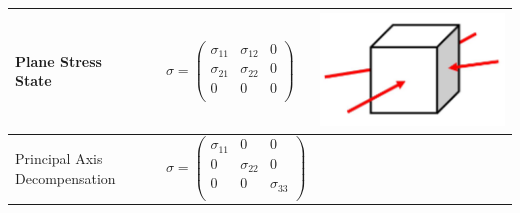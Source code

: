 \begin{tabularx}{\columnwidth}{p{2cm}p{2cm}XX}
		\hline 
		Plane Stress State && $ \sigma = \begin{pmatrix} \sigma_{11} & \sigma_{12} & 0\\ \sigma_{21} & \sigma_{22} & 0\\ 0 & 0 & 0\\ \end{pmatrix}$&	\vspace*{-1.0cm}	\includegraphics[scale=.12]{images/3Dcfplanestress}\\
		\hline 
		Principal Axis Decompensation &&$ \sigma = \begin{pmatrix} \sigma_{11} &  0& 0\\ 0 & \sigma_{22} & 0\\ 0 & 0 & \sigma_{33}\\ \end{pmatrix}$&\\
		\hline 

\end{tabularx}
